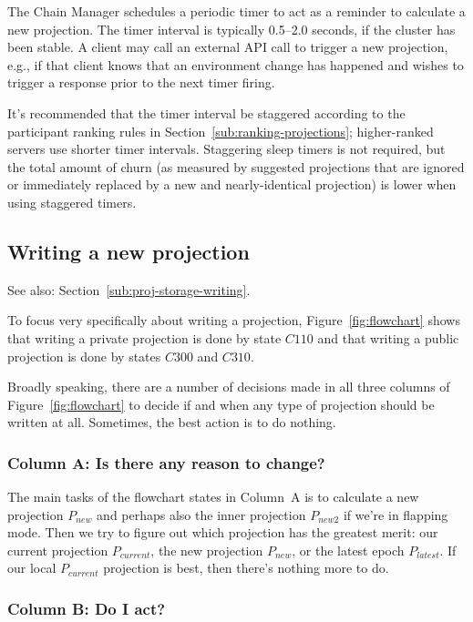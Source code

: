 \documentclass[preprint,10pt]{sigplanconf}
\begin{document}
The Chain Manager schedules a periodic timer to act as a reminder to
calculate a new projection.  The timer interval is typically
0.5--2.0 seconds, if the cluster has been stable.  A client may call an
external API call to trigger a new projection, e.g., if that client
knows that an environment change has happened and wishes to trigger a
response prior to the next timer firing.

It's recommended that the timer interval be staggered according to the
participant ranking rules in Section~\ref{sub:ranking-projections};
higher-ranked servers use shorter timer intervals.  Staggering sleep timers
is not required, but the total amount of churn (as measured by
suggested projections that are ignored or immediately replaced by a
new and nearly-identical projection) is lower when using staggered
timers.

\subsection{Writing a new projection}
\label{sub:humming-proj-storage-writing}

See also: Section~\ref{sub:proj-storage-writing}.

To focus very specifically about writing a projection,
Figure~\ref{fig:flowchart} shows that writing a private projection is
done by state $C110$ and that writing a public projection is done by
states $C300$ and $C310$.

Broadly speaking, there are a number of decisions made in all three
columns of Figure~\ref{fig:flowchart} to decide if and when any type
of projection should be written at all.  Sometimes, the best action is
to do nothing.

\subsubsection{Column A: Is there any reason to change?}

The main tasks of the flowchart states in Column~A is to calculate a
new projection $P_{new}$ and perhaps also the inner projection
$P_{new2}$ if we're in flapping mode.  Then we try to figure out which
projection has the greatest merit: our current projection
$P_{current}$, the new projection $P_{new}$, or the latest epoch
$P_{latest}$.  If our local $P_{current}$ projection is best, then
there's nothing more to do.

\subsubsection{Column B: Do I act?}
\end{document}
